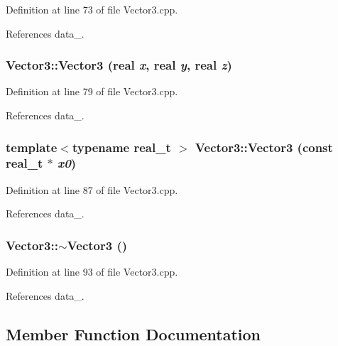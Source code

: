 Definition at line 73 of file Vector3.cpp.



References data\_\-.

\subsubsection[{Vector3}]{\setlength{\rightskip}{0pt plus 5cm}Vector3::Vector3 ({\bf real} {\em x}, \/  {\bf real} {\em y}, \/  {\bf real} {\em z})}\label{classVector3_a1988729343351dc199b041cc89a796e1}


Definition at line 79 of file Vector3.cpp.



References data\_\-.

\subsubsection[{Vector3}]{\setlength{\rightskip}{0pt plus 5cm}template$<$typename real\_\-t $>$ Vector3::Vector3 (const real\_\-t $\ast$ {\em x0})}\label{classVector3_aefe96fed8ce3fa3849f5730d953db4c3}


Definition at line 87 of file Vector3.cpp.



References data\_\-.

\subsubsection[{$\sim$Vector3}]{\setlength{\rightskip}{0pt plus 5cm}Vector3::$\sim$Vector3 ()}\label{classVector3_a5545e13e2e2861ece8f14b12a6a8101f}


Definition at line 93 of file Vector3.cpp.



References data\_\-.



\subsection{Member Function Documentation}
